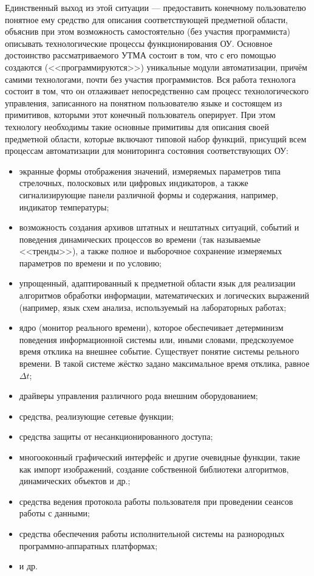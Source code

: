 Единственный выход из этой ситуации --- предоставить конечному
пользователю понятное ему средство для описания соответствующей
предметной области, объяснив при этом возможность самостоятельно (без
участия программиста) описывать технологические процессы
функционирования ОУ. Основное достоинство рассматриваемого УТМА
состоит в том, что с его помощью создаются (<<программируются>>)
уникальные модули автоматизации, причём самими технологами, почти без
участия программистов. Вся работа технолога состоит в том, что он
отлаживает непосредственно сам процесс технологического управления,
записанного на понятном пользователю языке и состоящем из примитивов,
которыми этот конечный пользователь оперирует. При этом технологу
необходимы такие основные примитивы для описания своей предметной
области, которые включают типовой набор функций, присущий всем
процессам автоматизации для мониторинга состояния соответствующих ОУ:
\begin{itemize}
\item экранные формы отображения значений, измеряемых параметров типа
  стрелочных, полосковых или цифровых индикаторов, а также
  сигнализирующие панели различной формы и содержания, например,
  индикатор температуры;
\item возможность создания архивов штатных и нештатных ситуаций,
  событий и поведения динамических процессов во времени (так
  называемые <<тренды>>), а также полное и выборочное сохранение
  измеряемых параметров по времени и по условию;
\item упрощенный, адаптированный к предметной области язык для
  реализации алгоритмов обработки информации, математических и
  логических выражений (например, язык схем анализа, используемый на
  лабораторных работах;
\item ядро (монитор реального времени), которое обеспечивает
  детерминизм поведения информационной системы или, иными словами,
  предскозуемое время отклика на внешнее событие. Существует понятие
  системы рельного времени. В такой системе жёстко задано максимальное
  время отклика, равное $\Delta t$;
\item драйверы управления различного рода внешним оборудованием;
\item средства, реализующие сетевые функции;
\item средства защиты от несанкционированного доступа;
\item многооконный графический интерфейс и другие очевидные функции,
  такие как импорт изображений, создание собственной библиотеки
  алгоритмов, динамических объектов и др.;
\item средства ведения протокола работы пользователя при проведении
  сеансов работы с данными;
\item средства обеспечения работы исполнительной системы на
  разнородных про\-грамм\-но-ап\-па\-рат\-ных платформах;
\item и др.
\end{itemize}

